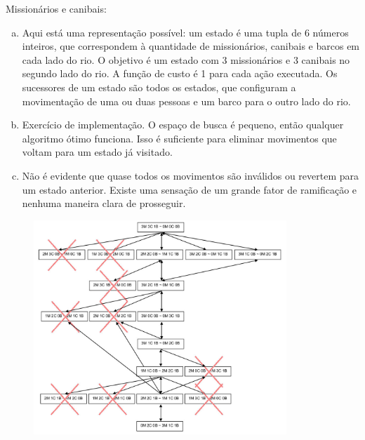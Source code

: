 \begin{solution}
Missionários e canibais:
\begin{enumerate}[a.]
	\item Aqui está uma representação possível: um estado é uma tupla de 6 números inteiros, que correspondem à quantidade de missionários, canibais e barcos em cada lado do rio. O objetivo é um estado com 3 missionários e 3 canibais no segundo lado do rio. A função de custo é 1 para cada ação executada. Os sucessores de um estado são todos os estados, que configuram a movimentação de uma ou duas pessoas e um barco para o outro lado do rio.
	
	\item Exercício de implementação. O espaço de busca é pequeno, então qualquer algoritmo ótimo funciona. Isso é suficiente para eliminar movimentos que voltam para um estado já visitado.
	
	\item Não é evidente que quase todos os movimentos são inválidos ou revertem para um estado anterior. Existe uma sensação de um grande fator de ramificação e nenhuma maneira clara de prosseguir.
\end{enumerate}

\begin{figure}[h]
	\centering
	\includegraphics[width=0.85\textwidth]{img/exercicios/missionarios-canibais}
\end{figure}
\end{solution}

\insertspace
\insertspace

